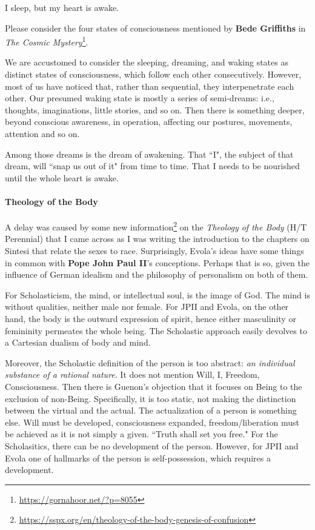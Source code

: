 \begin{quotex}
I sleep, but my heart is awake. 
\end{quotex}

Please consider the four states of consciousness mentioned by \textbf{Bede Griffiths} in \textit{The Cosmic Mystery}\footnote{\url{https://gornahoor.net/?p=8055}}.

We are accustomed to consider the sleeping, dreaming, and waking states as distinct states of consciousness, which follow each other consecutively. However, most of us have noticed that, rather than sequential, they interpenetrate each other. Our presumed waking state is mostly a series of semi-dreams: i.e., thoughts, imaginations, little stories, and so on. Then there is something deeper, beyond conscious awareness, in operation, affecting our postures, movements, attention and so on.

Among those dreams is the dream of awakening. That ``I", the subject of that dream, will ``snap us out of it" from time to time. That I needs to be nourished until the whole heart is awake.

\paragraph{Theology of the Body}
A delay was caused by some new information\footnote{\url{https://sspx.org/en/theology-of-the-body-genesis-of-confusion}} on the \textit{Theology of the Body} (H/T Perennial) that I came across as I was writing the introduction to the chapters on Sintesi that relate the sexes to race. Surprisingly, Evola's ideas have some things in common with \textbf{Pope John Paul II}'s conceptions. Perhaps that is so, given the influence of German idealism and the philosophy of personalism on both of them.

For Scholasticism, the mind, or intellectual soul, is the image of God. The mind is without qualities, neither male nor female. For JPII and Evola, on the other hand, the body is the outward expression of spirit, hence either masculinity or femininity permeates the whole being. The Scholastic approach easily devolves to a Cartesian dualism of body and mind.

Moreover, the Scholastic definition of the person is too abstract: \emph{an individual substance of a rational nature}. It does not mention Will, I, Freedom, Consciousness. Then there is Guenon's objection that it focuses on Being to the exclusion of non-Being. Specifically, it is too static, not making the distinction between the virtual and the actual. The actualization of a person is something else. Will must be developed, consciousness expanded, freedom/liberation must be achieved as it is not simply a given. ``Truth shall set you free." For the Scholasitics, there can be no development of the person. However, for JPII and Evola one of hallmarks of the person is self-possession, which requires a development.

